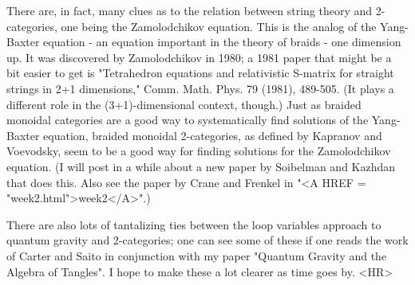 There are, in fact, many clues as to the relation between string theory
and 2-categories, one being the Zamolodchikov equation.  This is the 
analog of the Yang-Baxter equation - an equation important in the theory
of braids - one dimension up.  It was discovered by Zamolodchikov in
1980; a 1981 paper that might be a bit easier to get is "Tetrahedron
equations and relativistic S-matrix for straight strings in 2+1
dimensions," Comm. Math. Phys. 79 (1981), 489-505.   (It plays a
different role in the (3+1)-dimensional context, though.)  Just as
braided monoidal categories are a good way to systematically find
solutions of the Yang-Baxter equation, braided monoidal 2-categories,
as defined by Kapranov and Voevodsky, seem to be a good way for finding
solutions for the Zamolodchikov equation.   (I will post in a while
about a new paper by Soibelman and Kazhdan that does this.  Also see the
paper by Crane and Frenkel in "<A HREF = "week2.html">week2</A>".)  

There are also lots of tantalizing ties between the loop variables approach
to quantum gravity and 2-categories; one can see some of these if one
reads the work of Carter and Saito in conjunction with my paper "Quantum
Gravity and the Algebra of Tangles".  I hope to make these a lot clearer
as time goes by.
<HR>



